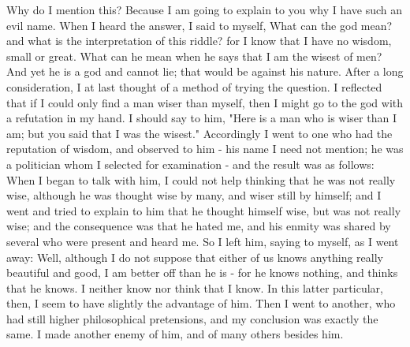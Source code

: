 Why do I mention this? Because I am going to explain to you why I
have such an evil name. When I heard the answer, I said to myself,
What can the god mean? and what is the interpretation of this riddle?
for I know that I have no wisdom, small or great. What can he mean
when he says that I am the wisest of men? And yet he is a god and
cannot lie; that would be against his nature. After a long consideration,
I at last thought of a method of trying the question. I reflected
that if I could only find a man wiser than myself, then I might go
to the god with a refutation in my hand. I should say to him, "Here
is a man who is wiser than I am; but you said that I was the wisest."
Accordingly I went to one who had the reputation of wisdom, and observed
to him - his name I need not mention; he was a politician whom I selected
for examination - and the result was as follows: When I began to talk
with him, I could not help thinking that he was not really wise, although
he was thought wise by many, and wiser still by himself; and I went
and tried to explain to him that he thought himself wise, but was
not really wise; and the consequence was that he hated me, and his
enmity was shared by several who were present and heard me. So I left
him, saying to myself, as I went away: Well, although I do not suppose
that either of us knows anything really beautiful and good, I am better
off than he is - for he knows nothing, and thinks that he knows. I
neither know nor think that I know. In this latter particular, then,
I seem to have slightly the advantage of him. Then I went to another,
who had still higher philosophical pretensions, and my conclusion
was exactly the same. I made another enemy of him, and of many others
besides him. 

